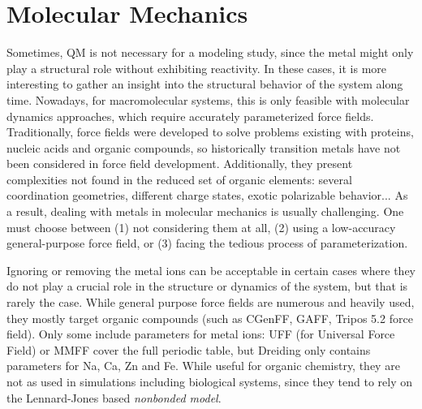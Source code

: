 \section{Molecular Mechanics}
Sometimes, QM is not necessary for a modeling study, since the metal might only play a structural role without exhibiting reactivity. In these cases, it is more interesting to gather an insight into the structural behavior of the system along time. Nowadays, for macromolecular systems, this is only feasible with molecular dynamics approaches, which require accurately parameterized force fields. Traditionally, force fields were developed to solve problems existing with proteins, nucleic acids and organic compounds,\cite{lifson1968consistent,allinger1973,momany1975energy} so historically transition metals have not been considered in force field development. Additionally, they present complexities not found in the reduced set of organic elements: several coordination geometries, different charge states, exotic polarizable behavior... As a result, dealing with metals in molecular mechanics is usually challenging. One must choose between (1) not considering them at all, (2) using a low-accuracy general-purpose force field, or (3) facing the tedious process of parameterization.

Ignoring or removing the metal ions can be acceptable in certain cases where they do not play a crucial role in the structure or dynamics of the system, but that is rarely the case. While general purpose force fields are numerous and heavily used, they mostly target organic compounds (such as CGenFF,\cite{Vanommeslaeghe2009} GAFF,\cite{Wang2004} Tripos 5.2 force field\cite{clark1989}). Only some include parameters for metal ions: UFF (for Universal Force Field\cite{Rappe1992}) or MMFF\cite{halgren1996} cover the full periodic table, but Dreiding\cite{Mayo1990} only contains parameters for Na, Ca, Zn and Fe. While useful for organic chemistry, they are not as used in simulations including biological systems, since they tend to rely on the Lennard-Jones based \textit{nonbonded model}.

